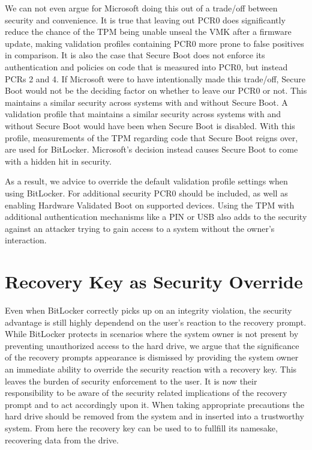 We can not even argue for Microsoft doing this out of a trade\-/off between security and convenience.
It is true that leaving out \ac{PCR}0 does significantly reduce the chance of the \ac{TPM} being unable unseal the \ac{VMK} after a firmware update, making validation profiles containing \ac{PCR}0 more prone to false positives in comparison.
It is also the case that Secure Boot does not enforce its authentication and policies on code that is measured into \ac{PCR}0, but instead \acp{PCR} 2 and 4.
If Microsoft were to have intentionally made this trade\-/off, Secure Boot would not be the deciding factor on whether to leave our \ac{PCR}0 or not.
This maintains a similar security across systems with and without Secure Boot.
A validation profile that maintains a similar security across systems with and without Secure Boot would have been  when Secure Boot is disabled.
With this profile, measurements of the \ac{TPM} regarding code that Secure Boot reigns over, are used for BitLocker.
Microsoft's decision instead causes Secure Boot to come with a hidden hit in security.

As a result, we advice to override the default validation profile settings when using BitLocker.
For additional security \ac{PCR}0 should be included, as well as enabling Hardware Validated Boot on supported devices.
Using the \ac{TPM} with additional authentication mechanisms like a \ac{PIN} or \ac{USB} also adds to the security against an attacker trying to gain access to a system without the owner's interaction.

\section{Recovery Key as Security Override}

Even when BitLocker correctly picks up on an integrity violation, the security advantage is still highly dependend on the user's reaction to the recovery prompt.
While BitLocker protects in scenarios where the system owner is not present by preventing unauthorized access to the hard drive, we argue that the significance of the recovery prompts appearance is dismissed by providing the system owner an immediate ability to override the security reaction with a recovery key.
This leaves the burden of security enforcement to the user.
It is now their responsibility to be aware of the security related implications of the recovery prompt and to act accordingly upon it.
When taking appropriate precautions the hard drive should be removed from the system and in inserted into a trustworthy system.
From here the recovery key can be used to to fullfill its namesake, recovering data from the drive.

